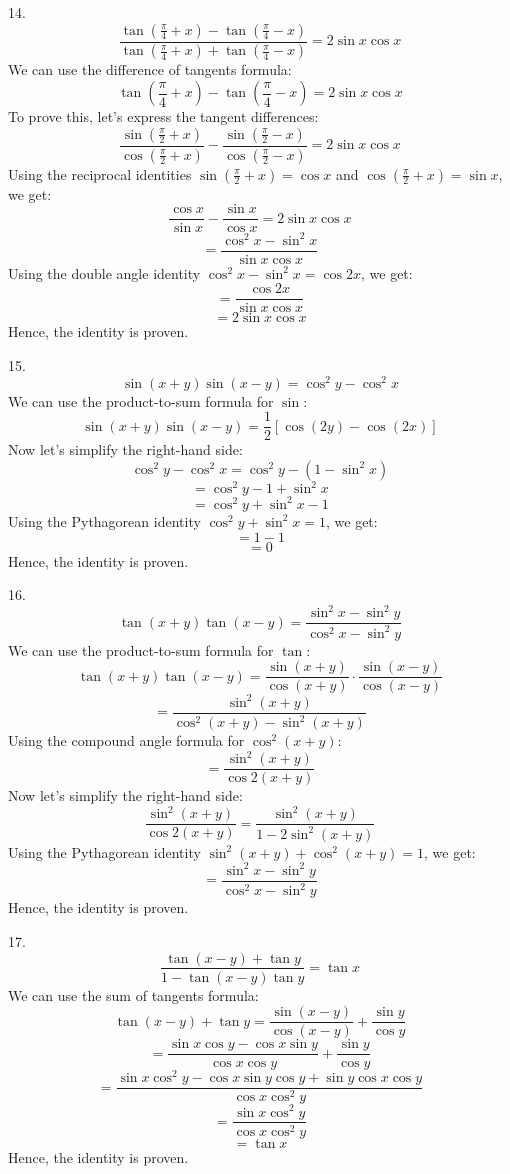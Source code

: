 \documentclass{article}
\begin{document}
\vspace{2em}
14. $$\frac{\tan \left(\frac{\pi}{4} + x\right) - \tan \left(\frac{\pi}{4} - x\right)}{\tan \left(\frac{\pi}{4} + x\right) + \tan \left(\frac{\pi}{4} - x\right)} = 2 \sin x \cos x$$
    We can use the difference of tangents formula:
    \[\tan \left(\frac{\pi}{4} + x\right) - \tan \left(\frac{\pi}{4} - x\right) = 2 \sin x \cos x\]
    To prove this, let's express the tangent differences:
    \[\frac{\sin \left(\frac{\pi}{2} + x\right)}{\cos \left(\frac{\pi}{2} + x\right)} - \frac{\sin \left(\frac{\pi}{2} - x\right)}{\cos \left(\frac{\pi}{2} - x\right)} = 2 \sin x \cos x\]
    Using the reciprocal identities \(\sin \left(\frac{\pi}{2} + x\right) = \cos x\) and \(\cos \left(\frac{\pi}{2} + x\right) = \sin x\), we get:
    \[\frac{\cos x}{\sin x} - \frac{\sin x}{\cos x} = 2 \sin x \cos x\]
    \[= \frac{\cos^2 x - \sin^2 x}{\sin x \cos x}\]
    Using the double angle identity \(\cos^2 x - \sin^2 x = \cos 2x\), we get:
    \[= \frac{\cos 2x}{\sin x \cos x}\]
    \[= 2 \sin x \cos x\]
    Hence, the identity is proven.

\vspace{2em}
15. $$\sin (x+y) \sin (x-y) = \cos^2 y - \cos^2 x$$
    We can use the product-to-sum formula for \(\sin\):
    \[\sin (x+y) \sin (x-y) = \frac{1}{2}[\cos(2y) - \cos(2x)]\]
    Now let's simplify the right-hand side:
    \[\cos^2 y - \cos^2 x = \cos^2 y - (1 - \sin^2 x)\]
    \[= \cos^2 y - 1 + \sin^2 x\]
    \[= \cos^2 y + \sin^2 x - 1\]
    Using the Pythagorean identity \(\cos^2 y + \sin^2 x = 1\), we get:
    \[= 1 - 1\]
    \[= 0\]
    Hence, the identity is proven.

\vspace{2em}
16. $$\tan (x+y) \tan (x-y) = \frac{\sin^2 x - \sin^2 y}{\cos^2 x - \sin^2 y}$$
    We can use the product-to-sum formula for \(\tan\):
    \[\tan (x+y) \tan (x-y) = \frac{\sin(x+y)}{\cos(x+y)} \cdot \frac{\sin(x-y)}{\cos(x-y)}\]
    \[= \frac{\sin^2 (x+y)}{\cos^2 (x+y) - \sin^2 (x+y)}\]
    Using the compound angle formula for \(\cos^2 (x+y)\):
    \[= \frac{\sin^2 (x+y)}{\cos 2(x+y)}\]
    Now let's simplify the right-hand side:
    \[\frac{\sin^2 (x+y)}{\cos 2(x+y)} = \frac{\sin^2 (x+y)}{1 - 2\sin^2 (x+y)}\]
    Using the Pythagorean identity \(\sin^2 (x+y) + \cos^2 (x+y) = 1\), we get:
    \[= \frac{\sin^2 x - \sin^2 y}{\cos^2 x - \sin^2 y}\]
    Hence, the identity is proven.

\vspace{2em}
17. $$\frac{\tan (x-y) + \tan y}{1 - \tan (x-y) \tan y} = \tan x$$
    We can use the sum of tangents formula:
    \[\tan (x-y) + \tan y = \frac{\sin (x-y)}{\cos (x-y)} + \frac{\sin y}{\cos y}\]
    \[= \frac{\sin x \cos y - \cos x \sin y}{\cos x \cos y} + \frac{\sin y}{\cos y}\]
    \[= \frac{\sin x \cos^2 y - \cos x \sin y \cos y + \sin y \cos x \cos y}{\cos x \cos^2 y}\]
    \[= \frac{\sin x \cos^2 y}{\cos x \cos^2 y}\]
    \[= \tan x\]
    Hence, the identity is proven.
\end{document}
